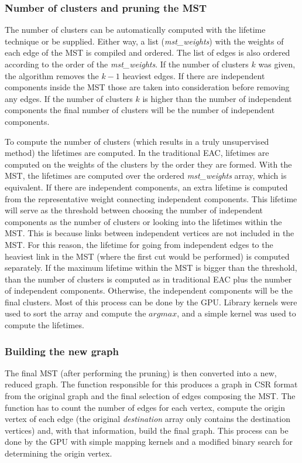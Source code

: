 \subsubsection{Number of clusters and pruning the MST}
The number of clusters can be automatically computed with the lifetime technique or be supplied. 
Either way, a list (\emph{mst\_weights}) with the weights of each edge of the MST is compiled and ordered.
The list of edges is also ordered according to the order of the \emph{mst\_weights}. 
If the number of clusters $k$ was given, the algorithm removes the $k - 1$ heaviest edges. 
If there are independent components inside the MST those are taken into consideration before removing any edges.
If the number of clusters $k$ is higher than the number of independent components the final number of clusters will be the number of independent components.

To compute the number of clusters (which results in a truly unsupervised method) the lifetimes are computed.
In the traditional EAC, lifetimes are computed on the weights of the clusters by the order they are formed.
With the MST, the lifetimes are computed over the ordered \emph{mst\_weights} array, which is equivalent.
If there are independent components, an extra lifetime is computed from the representative weight connecting independent components.
This lifetime will serve as the threshold between choosing the number of independent components as the number of clusters or looking into the lifetimes within the MST.
This is because links between independent vertices are not included in the MST.
For this reason, the lifetime for going from independent edges to the heaviest link in the MST (where the first cut would be performed) is computed separately.
If the maximum lifetime within the MST is bigger than the threshold, than the number of clusters is computed as in traditional EAC plus the number of independent components.
Otherwise, the independent components will be the final clusters.
Most of this process can be done by the GPU. 
Library kernels were used to sort the array and compute the $arg max$, and a simple kernel was used to compute the lifetimes.

\subsubsection{Building the new graph}
The final MST (after performing the pruning) is then converted into a new, reduced graph.
The function responsible for this produces a graph in CSR format from the original graph and the final selection of edges composing the MST.
The function has to count the number of edges for each vertex, compute the origin vertex of each edge (the original \emph{destination} array only contains the destination vertices) and, with that information, build the final graph.
This process can be done by the GPU with simple mapping kernels and a modified binary search for determining the origin vertex.


